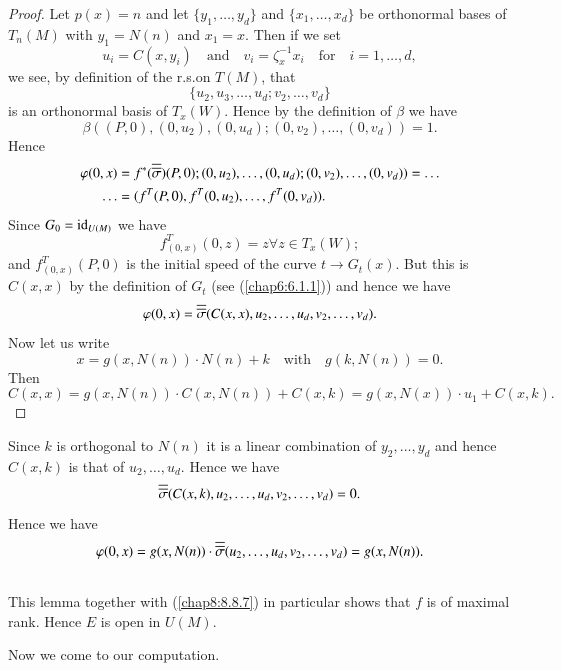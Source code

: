 \begin{proof}
Let $p(x)=n$ and let $\{y_{1},\ldots,y_{d}\}$ and
$\{x_{1},\ldots,x_{d}\}$ be orthonormal bases of $T_{n}(M)$ with
$y_{1}=N(n)$ and $x_{1}=x$. Then if we set
$$
u_{i}=C(x,y_{i})\quad\text{and}\quad
v_{i}=\zeta^{-1}_{x}x_{i}\quad\text{for}\quad i=1,\ldots,d,
$$
we see, by definition of the r.s.\@ on $T(M)$, that
$$
\{u_{2},u_{3},\ldots,u_{d};v_{2},\ldots,v_{d}\}
$$
is an orthonormal basis of $T_{x}(W)$. Hence by the definition of
$\beta$ we have
$$
\beta((P,0),(0,u_{2}),(0,u_{d});(0,v_{2}),\ldots,(0,v_{d}))=1.
$$
Hence
\begin{align*}
\varphi(0,x) &=
f^{\ast}(\overline{\overline{\sigma}})(P,0);(0,u_{2}),\ldots,(0,u_{d});(0,v_{2}),\ldots,(0,v_{d}))=\ldots\\
\ldots &= (f^{T}(P,0),f^{T}(0,u_{2}),\ldots,f^{T}(0,v_{d})). 
\end{align*}
Since $G_{0}=\operatorname{id}_{U(M)}$ we have
$$
f^{T}_{(0,x)}(0,z)=z\forall z\in T_{x}(W);
$$
and $f^{T}_{(0,x)}(P,0)$ is the initial speed of the curve $t\to
G_{t}(x)$. But this is $C(x,x)$ by the definition of $G_{t}$ (see
(\ref{chap6:6.1.1})) and hence we have
$$
\varphi(0,x)=\overline{\overline{\sigma}}(C(x,x),u_{2},\ldots,u_{d},v_{2},\ldots,v_{d}).
$$
Now \pageoriginale let us write
$$
x=g(x,N(n))\cdot N(n)+k\quad\text{with}\quad g(k,N(n))=0.
$$
Then 
$$
C(x,x)=g(x,N(n))\cdot C(x,N(n))+C(x,k)=g(x,N(x))\cdot u_{1}+C(x,k).
$$
\end{proof}

Since $k$ is orthogonal to $N(n)$ it is a linear combination of
$y_{2},\ldots,y_{d}$ and hence $C(x,k)$ is that of
$u_{2},\ldots,u_{d}$. Hence we have
$$
\overline{\overline{\sigma}}(C(x,k),u_{2},\ldots,u_{d},v_{2},\ldots,v_{d})=0.
$$
Hence we have
$$
\varphi(0,x)=g(x,N(n))\cdot\overline{\overline{\sigma}}(u_{2},\ldots,u_{d},v_{2},\ldots,v_{d})=g(x,N(n)). 
$$

\subsection{}\label{chap8:8.8.9}


\begin{remarks*}
This lemma together with (\ref{chap8:8.8.7}) in particular shows that $f$
is of maximal rank. Hence $E$ is open in $U(M)$.
\end{remarks*}

Now we come to our computation.

\subsection{}\label{chap8:8.8.10}

